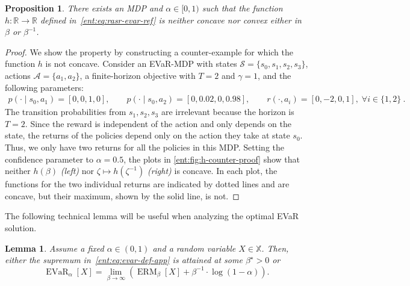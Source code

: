\documentclass[twoside]{article}
\newcommand{\states}{\mathcal{S}}
\newcommand{\actions}{\mathcal{A}}
\newcommand{\opt}{^\star}
\newcommand{\erm}[2]{\operatorname{ERM}_{#1}\left[#2\right]}
\newcommand{\evar}[2]{\operatorname{EVaR}_{#1} \left[#2\right]}
\newcommand{\Real}{\mathbb{R}}
\theoremstyle{plain}
\newtheorem{proposition}[theorem]{Proposition}
\newtheorem{lemma}[theorem]{Lemma}
\theoremstyle{definition}
\theoremstyle{remark}
\begin{document}
\begin{proposition}\label{ent:prop:non-concave}
There exists an MDP and $\alpha \in [0,1)$ such that the function $h\colon  \Real \to \Real$ defined in~\eqref{ent:eq:rasr-evar-ref} is neither concave nor convex either in $\beta$ or $\beta^{-1}$.
\end{proposition}

\begin{proof}
We show the property by constructing a counter-example for which the function $h$ is not concave. Consider an EVaR-MDP with states $\states  = \{s_0, s_1, s_2, s_3\}$, actions $\actions = \{a_1, a_2\}$, a finite-horizon objective with $T = 2$ and $\gamma = 1$, and the following parameters:
%
\begin{align*}
p(\cdot  \mid s_0, a_1) = [0, 0, 1, 0], \qquad p(\cdot  \mid s_0, a_2) = [0, 0.02, 0, 0.98], \qquad r(\cdot , a_i) = [0, -2, 0, 1],\;\forall i \in  \{1,2\}~.
\end{align*}
%
The transition probabilities from $s_1, s_2, s_3$ are irrelevant because the horizon is $T=2$. Since the reward is independent of the action and only depends on the state, the returns of the policies depend only on the action they take at state $s_0$. Thus, we only have two returns for all the policies in this MDP. Setting the confidence parameter to $\alpha = 0.5$, the plots in \cref{ent:fig:h-counter-proof} show that neither $h(\beta)$ {\em (left)} nor $\zeta \mapsto h(\zeta^{-1})$ {\em (right)} is concave. In each plot, the functions for the two individual returns are indicated by dotted lines and are concave, but their maximum, shown by the solid line, is not. 
\end{proof}

The following technical lemma will be useful when analyzing the optimal EVaR solution.
\begin{lemma}\label{ent:lem:evar-supremum}
Assume a fixed $\alpha \in (0,1)$ and a random variable $X\in \mathbb{X}$. Then, either the supremum in~\eqref{ent:eq:evar-def-app} is attained at some $\beta\opt > 0$ or
  \[
   \evar{\alpha}{X} = \lim_{\beta \to \infty}  \left(\erm{\beta}{X} + \beta^{-1}\cdot\log(1 - \alpha)\right).
  \]
\end{lemma}
\end{document}
